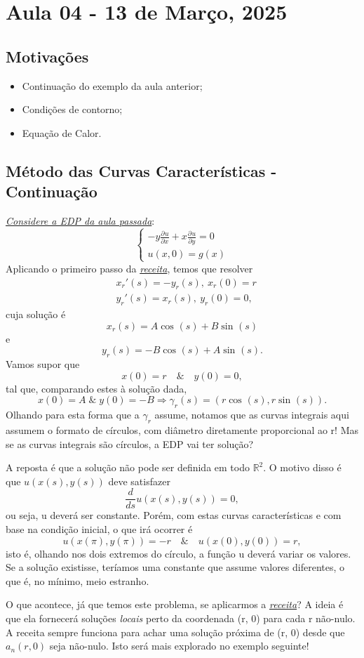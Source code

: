 \documentclass[../pde_notes.tex]{subfiles}
\begin{document}
\section{Aula 04 - 13 de Março, 2025}
\subsection{Motivações}
\begin{itemize}
	\item Continuação do exemplo da aula anterior;
	\item Condições de contorno;
	\item Equação de Calor.
\end{itemize}
\subsection{Método das Curvas Características - Continuação}
\begin{example}
	\hyperlink{nextclass03}{\textit{Considere a EDP da aula passada}}:
	\[
		\left\{\begin{array}{ll}
			-y \frac{\partial^{}u}{\partial x^{}} + x \frac{\partial^{}u}{\partial y^{}} = 0 \\
			u(x, 0) = g(x)
		\end{array}\right.
	\]
	Aplicando o primeiro passo da \hyperlink{recipe}{\textit{receita}}, temos que resolver
	\begin{align*}
		 & x_{r}'(s) = -y_{r}(s), \: x_{r}(0) = r \\
		 & y_{r}'(s) = x_{r}(s), \: y_{r}(0) = 0,
	\end{align*}
	cuja solução é
	\[
		x_{r}(s) = A \cos^{}{(s)} + B\sin^{}{(s)}
	\]
	e
	\[
		y_{r}(s) = -B\cos^{}{(s)} + A\sin^{}{(s)}.
	\]
	Vamos supor que
	\[
		x(0) = r \quad\&\quad y(0) = 0,
	\]
	tal que, comparando estes à solução dada,
	\[
		x(0) = A \;\&\; y(0) = - B \Rightarrow \gamma_{r}(s)=(r\cos^{}{(s)}, r\sin^{}{(s)}).
	\]
	Olhando para esta forma que a \(\gamma_{r}\) assume, notamos que as curvas integrais aqui assumem o formato de círculos, com diâmetro diretamente proporcional ao r!
	Mas se as curvas integrais são círculos, a EDP vai ter solução?

	A reposta é que a solução não pode ser definida em todo \(\mathbb{R}^{2}\). O motivo disso é que \(u(x(s), y(s))\) deve satisfazer
	\[
		\frac{d}{ds}u(x(s), y(s)) = 0,
	\]
	ou seja, u deverá ser constante. Porém, com estas curvas características e com base na condição inicial, o que irá ocorrer é
	\[
		u(x(\pi ), y(\pi )) = -r \quad\&\quad u(x(0), y(0)) = r,
	\]
	isto é, olhando nos dois extremos do círculo, a função u deverá variar os valores. Se a solução existisse, teríamos uma constante que assume valores diferentes, o que é, no mínimo, meio estranho.

	O que acontece, já que temos este problema, se aplicarmos a \hyperlink{recipe}{\textit{receita}}? A ideia é que ela fornecerá soluções \textit{locais} perto da coordenada (r, 0) para cada r não-nulo.
	A receita sempre funciona para achar uma solução próxima de (r, 0) desde que \(a_{n}(r, 0)\) seja não-nulo. Isto será mais explorado no exemplo seguinte!

\end{example}
\end{document}
